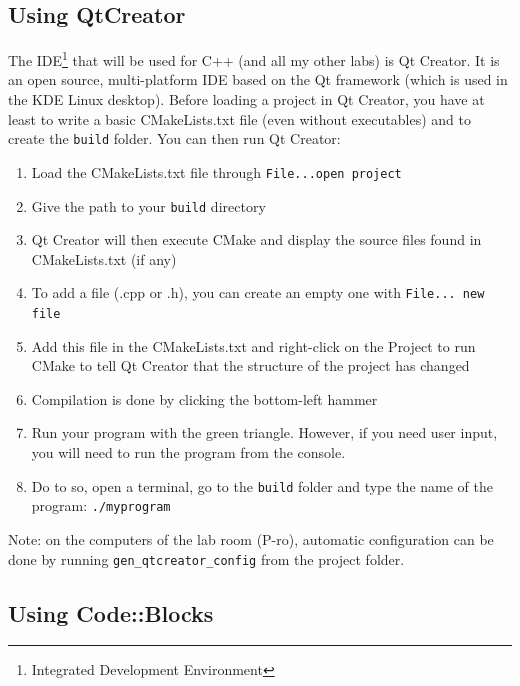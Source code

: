 \documentclass{ecnreport}
\begin{document}
\subsection{Using QtCreator}

The IDE\footnote{Integrated Development Environment} that will be used for C++ (and all my other labs) is Qt Creator. It is an open source, multi-platform IDE based on the Qt framework (which is used in the KDE Linux desktop). 
Before loading a project in Qt Creator, you have at least to write a basic CMakeLists.txt file (even without executables) and to create the \texttt{build} folder. You can then run Qt Creator:
\begin{enumerate}
	\item Load the CMakeLists.txt file through \texttt{File...open project}
	\item Give the path to your \texttt{build} directory
	\item Qt Creator will then execute CMake and display the source files found in CMakeLists.txt (if any)
	\item To add a file (.cpp or .h), you can create an empty one with \texttt{File... new file} 
	\item Add this file in the CMakeLists.txt and right-click on the Project to run CMake to tell Qt Creator that the structure of the project has changed
	\item Compilation is done by clicking the bottom-left hammer
	\item Run your program with the green triangle. However, if you need user input, you will need to run the program from the console.
	\item Do to so, open a terminal, go to the \texttt{build} folder and type the name of the program: \texttt{./myprogram}
\end{enumerate}

Note: on the computers of the lab room (P-ro), automatic configuration can be done by running \texttt{gen\_qtcreator\_config} from the project folder.

\subsection{Using Code::Blocks}
\end{document}
